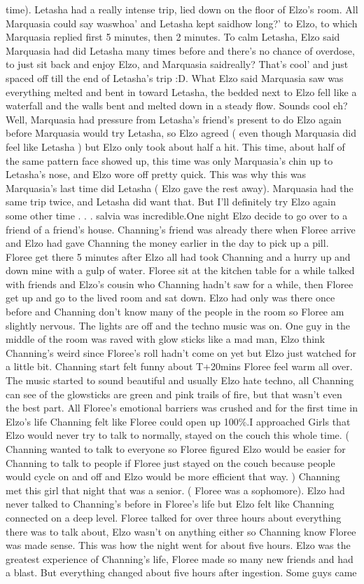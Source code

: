 \documentclass[12pt]{book}
\begin{document}
time). Letasha had a really intense trip, lied down on the floor of Elzo's room. All Marquasia could say waswhoa' and Letasha kept saidhow long?' to Elzo, to which Marquasia replied first 5 minutes, then 2 minutes. To calm Letasha, Elzo said Marquasia had did Letasha many times before and there's no chance of overdose, to just sit back and enjoy Elzo, and Marquasia saidreally? That's cool' and just spaced off till the end of Letasha's trip :D. What Elzo said Marquasia saw was everything melted and bent in toward Letasha, the bedded next to Elzo fell like a waterfall and the walls bent and melted down in a steady flow. Sounds cool eh? Well, Marquasia had pressure from Letasha's friend's present to do Elzo again before Marquasia would try Letasha, so Elzo agreed ( even though Marquasia did feel like Letasha ) but Elzo only took about half a hit. This time, about half of the same pattern face showed up, this time was only Marquasia's chin up to Letasha's nose, and Elzo wore off pretty quick. This was why this was Marquasia's last time did Letasha ( Elzo gave the rest away). Marquasia had the same trip twice, and Letasha did want that. But I'll definitely try Elzo again some other time . . . salvia was incredible.One night Elzo decide to go over to a friend of a friend's house. Channing's friend was already there when Floree arrive and Elzo had gave Channing the money earlier in the day to pick up a pill. Floree get there 5 minutes after Elzo all had took Channing and a hurry up and down mine with a gulp of water. Floree sit at the kitchen table for a while talked with friends and Elzo's cousin who Channing hadn't saw for a while, then Floree get up and go to the lived room and sat down. Elzo had only was there once before and Channing don't know many of the people in the room so Floree am slightly nervous. The lights are off and the techno music was on. One guy in the middle of the room was raved with glow sticks like a mad man, Elzo think Channing's weird since Floree's roll hadn't come on yet but Elzo just watched for a little bit. Channing start felt funny about T+20mins Floree feel warm all over. The music started to sound beautiful and usually Elzo hate techno, all Channing can see of the glowsticks are green and pink trails of fire, but that wasn't even the best part. All Floree's emotional barriers was crushed and for the first time in Elzo's life Channing felt like Floree could open up 100\%.I approached Girls that Elzo would never try to talk to normally, stayed on the couch this whole time. ( Channing wanted to talk to everyone so Floree figured Elzo would be easier for Channing to talk to people if Floree just stayed on the couch because people would cycle on and off and Elzo would be more efficient that way. ) Channing met this girl that night that was a senior. ( Floree was a sophomore). Elzo had never talked to Channing's before in Floree's life but Elzo felt like Channing connected on a deep level. Floree talked for over three hours about everything there was to talk about, Elzo wasn't on anything either so Channing know Floree was made sense. This was how the night went for about five hours. Elzo was the greatest experience of Channing's life, Floree made so many new friends and had a blast. But everything changed about five hours after ingestion. Some guys came 
\end{document}
